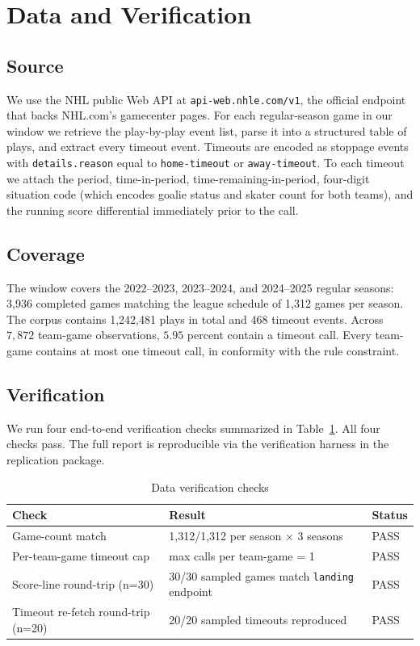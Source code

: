 \documentclass[11pt]{article}
\begin{document}
\section{Data and Verification}\label{sec:data}

\subsection{Source}

We use the NHL public Web API at \texttt{api-web.nhle.com/v1}, the official endpoint that backs NHL.com's gamecenter pages. For each regular-season game in our window we retrieve the play-by-play event list, parse it into a structured table of plays, and extract every timeout event. Timeouts are encoded as stoppage events with \texttt{details.reason} equal to \texttt{home-timeout} or \texttt{away-timeout}. To each timeout we attach the period, time-in-period, time-remaining-in-period, four-digit situation code (which encodes goalie status and skater count for both teams), and the running score differential immediately prior to the call.

\subsection{Coverage}

The window covers the 2022--2023, 2023--2024, and 2024--2025 regular seasons: 3{,}936 completed games matching the league schedule of 1{,}312 games per season. The corpus contains 1{,}242{,}481 plays in total and 468 timeout events. Across $7{,}872$ team-game observations, $5.95$ percent contain a timeout call. Every team-game contains at most one timeout call, in conformity with the rule constraint.

\subsection{Verification}

We run four end-to-end verification checks summarized in Table~\ref{tab:verification}. All four checks pass. The full report is reproducible via the verification harness in the replication package.

\begin{table}[ht]
\centering
\caption{Data verification checks}
\label{tab:verification}
\begin{tabular}{lll}
\toprule
\textbf{Check} & \textbf{Result} & \textbf{Status} \\
\midrule
Game-count match & 1{,}312/1{,}312 per season $\times$ 3 seasons & PASS \\
Per-team-game timeout cap & max calls per team-game = 1 & PASS \\
Score-line round-trip (n=30) & 30/30 sampled games match \texttt{landing} endpoint & PASS \\
Timeout re-fetch round-trip (n=20) & 20/20 sampled timeouts reproduced & PASS \\
\bottomrule
\end{tabular}
\end{table}
\end{document}
